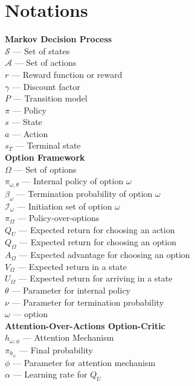\documentclass{article}
\begin{document}
	\section{Notations}
	{\bfseries Markov Decision Process}\\
	$\mathcal{S}$ --- Set of states\\
	$\mathcal{A}$ --- Set of actions\\
	$r$ --- Reward function or reward\\
	$\gamma$ --- Discount factor\\
	$P$ --- Transition model\\
	$\pi$ --- Policy\\
	$s$ --- State\\
	$a$ --- Action\\
	$s_T$ --- Terminal state\vspace{0.1in}\\
	{\bfseries Option Framework}\\
	$\Omega$ --- Set of options\\
	$\pi_{\omega,\theta}$ --- Internal policy of option $\omega$\\
	$\beta_\omega$ --- Termination probability of option $\omega$\\
	$\mathcal{I}_\omega$ --- Initiation set of option $\omega$\\
	$\pi_\Omega$ --- Policy-over-options\\
	$Q_U$ --- Expected return for choosing an action\\
	$Q_\Omega$ --- Expected return for choosing an option\\
	$A_\Omega$ --- Expected advantage for choosing an option\\
	$V_\Omega$ --- Expected return in a state\\
	$U_\Omega$ --- Expected return for arriving in a state\\
	$\theta$ --- Parameter for internal policy\\
	$\nu$ --- Parameter for termination probability\\
	$\omega$ --- option\vspace{0.1in}\\
	{\bfseries Attention-Over-Actions Option-Critic}\\
	$h_{\omega,\phi}$ --- Attention Mechanism\\
	$\pi_{h_\omega}$ --- Final probability\\
	$\phi$ --- Parameter for attention mechanism\\
	$\alpha$ --- Learning rate for $Q_U$\\
\end{document}
